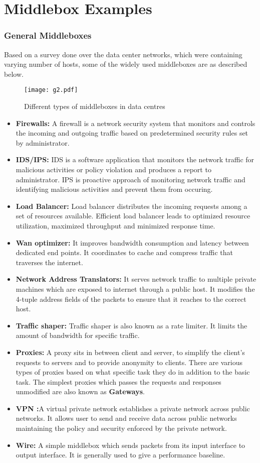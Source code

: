 \documentclass[a4paper,11pt]{report}
\begin{document}
\section{Middlebox Examples}
\subsubsection{General Middleboxes}
Based on a survey\cite{DM} done over the data center networks, which were containing varying number of hosts, some of the widely used middleboxes are as described below.
\begin{figure}[h]
\centering
\texttt{[image: g2.pdf]}
\caption{Different types of middleboxes in data centres~\cite{DM}}
\end{figure} 

\begin{itemize}
\item \textbf{Firewalls: }A firewall is a network security system that monitors and controls the incoming and outgoing traffic based on predetermined security rules set by administrator.~\cite{FW}
\item \textbf{IDS/IPS: }IDS is a software application that monitors the network traffic for malicious activities or policy violation and produces a report to administrator. IPS is proactive approach of monitoring network traffic and identifying malicious activities and prevent them from occuring.~\cite{IDS}
\item \textbf{Load Balancer: }Load balancer distributes the incoming requests among a set of resources available. Efficient load balancer leads to optimized resource utilization, maximized throughput and minimized response time.
\item \textbf{Wan optimizer: }It improves bandwidth consumption and latency between dedicated end points. It coordinates to cache and compress traffic that traverses the internet.~\cite{MB}
\item \textbf{Network Address Translators: }It serves network traffic to multiple private machines which are exposed to internet through a public host. It modifies the 4-tuple address fields of the packets to ensure that it reaches to the correct host.
\item \textbf{Traffic shaper: }Traffic shaper is also known as a rate limiter. It limits the amount of bandwidth for specific traffic.
\item \textbf{Proxies: }A proxy sits in between client and server, to simplify the client's requests to servers and to provide anonymity to clients. There are various types of proxies based on what specific task they do in addition to the basic task. The simplest proxies which passes the requests and responses unmodified are also known as \textbf{Gateways}.
\item \textbf{VPN :}A virtual private network establishes a private network across public networks. It allows user to send and receive data across public networks maintaining the policy and security enforced by the private network.  
\item \textbf{Wire: }A simple middlebox which sends packets from its input interface to output interface. It is generally used to give a performance baseline.            
\end{itemize}
\end{document}
